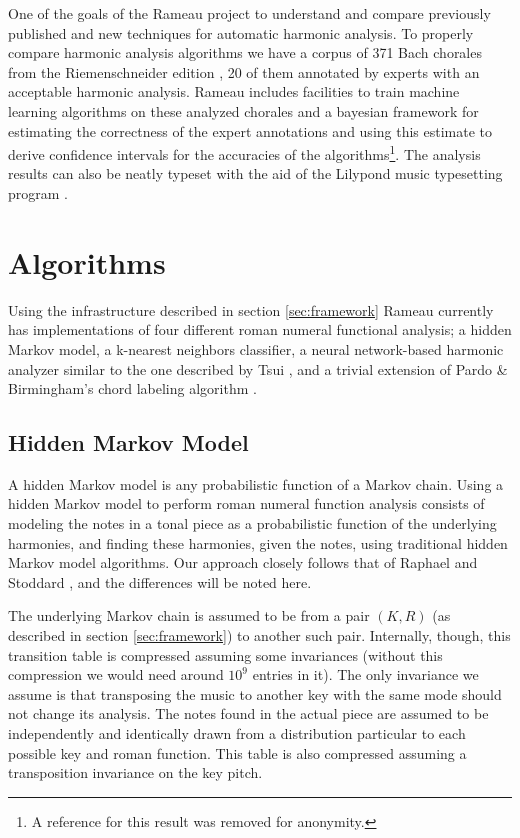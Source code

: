 One of the goals of the Rameau project to understand and compare
previously published and new techniques for automatic harmonic
analysis. To properly compare harmonic analysis algorithms we have a
corpus of 371 Bach chorales from the Riemenschneider edition
\cite{bach41:371}, 20 of them annotated by experts with an acceptable
harmonic analysis. Rameau includes facilities to train machine
learning algorithms on these analyzed chorales and a bayesian
framework for estimating the correctness of the expert annotations and
using this estimate to derive confidence intervals for the accuracies
of the algorithms\footnote{A reference for this result was removed for
  anonymity.}. The analysis results can also be neatly typeset with
the aid of the Lilypond music typesetting program
\cite{nienhuys.ea08:lilypond}.

\section{Algorithms}
\label{sec:algorithms}

Using the infrastructure described in section \ref{sec:framework}
Rameau currently has implementations of four different roman numeral
functional analysis; a hidden Markov model, a k-nearest neighbors
classifier, a neural network-based harmonic analyzer similar to the
one described by Tsui \cite{tsui02:harmonic}, and a trivial extension
of Pardo \& Birmingham's chord labeling algorithm
\cite{pardo.ea99:automated}.

\subsection{Hidden Markov Model}
\label{sec:hidden-markov-model}

A hidden Markov model is any probabilistic function of a Markov
chain. Using a hidden Markov model to perform roman numeral function
analysis consists of modeling the notes in a tonal piece as a
probabilistic function of the underlying harmonies, and finding these
harmonies, given the notes, using traditional hidden Markov model
algorithms. Our approach closely follows that of Raphael and Stoddard
\cite{raphael.ea03:harmonic}, and the differences will be noted here.

The underlying Markov chain is assumed to be from a pair $(K,R)$ (as
described in section \ref{sec:framework}) to another such
pair. Internally, though, this transition table is compressed assuming
some invariances (without this compression we would need around $10^9$
entries in it). The only invariance we assume is that transposing the
music to another key with the same mode should not change its
analysis. The notes found in the actual piece are assumed to be
independently and identically drawn from a distribution particular to
each possible key and roman function. This table is also compressed
assuming a transposition invariance on the key pitch. 

